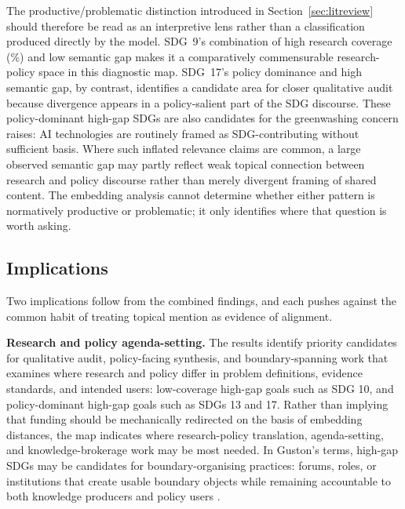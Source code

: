 \documentclass[12pt,a4paper]{article}
\begin{document}
The productive/problematic distinction introduced in Section~\ref{sec:litreview} should therefore be read as an interpretive lens rather than a classification produced directly by the model. SDG~9's combination of high research coverage (\ResearchPctSdgNine\%) and low semantic gap makes it a comparatively commensurable research-policy space in this diagnostic map. SDG~17's policy dominance and high semantic gap, by contrast, identifies a candidate area for closer qualitative audit because divergence appears in a policy-salient part of the SDG discourse. These policy-dominant high-gap SDGs are also candidates for the greenwashing concern \textcite{Heilinger2023} raises: AI technologies are routinely framed as SDG-contributing without sufficient basis. Where such inflated relevance claims are common, a large observed semantic gap may partly reflect weak topical connection between research and policy discourse rather than merely divergent framing of shared content. The embedding analysis cannot determine whether either pattern is normatively productive or problematic; it only identifies where that question is worth asking.

\subsection{Implications}

Two implications follow from the combined findings, and each pushes against the common habit of treating topical mention as evidence of alignment.

\textbf{Research and policy agenda-setting.} The results identify priority candidates for qualitative audit, policy-facing synthesis, and boundary-spanning work that examines where research and policy differ in problem definitions, evidence standards, and intended users: low-coverage high-gap goals such as SDG 10, and policy-dominant high-gap goals such as SDGs 13 and 17. Rather than implying that funding should be mechanically redirected on the basis of embedding distances, the map indicates where research-policy translation, agenda-setting, and knowledge-brokerage work may be most needed. In Guston's terms, high-gap SDGs may be candidates for boundary-organising practices: forums, roles, or institutions that create usable boundary objects while remaining accountable to both knowledge producers and policy users \parencite{Guston2001}.
\end{document}
